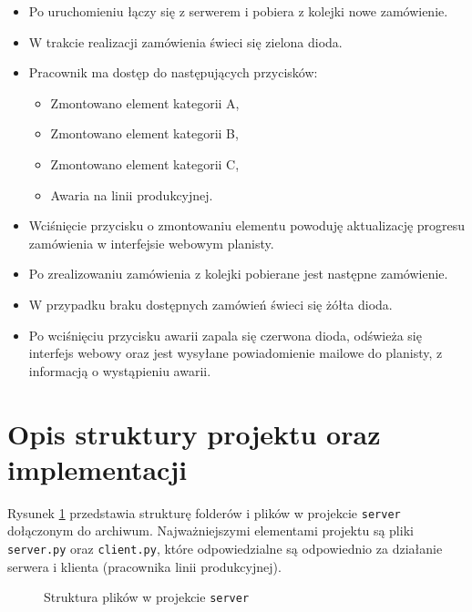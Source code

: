 \documentclass{article}
\begin{document}
\begin{itemize}
    \item Po uruchomieniu łączy się z serwerem i pobiera z kolejki nowe zamówienie.
    \item W trakcie realizacji zamówienia świeci się zielona dioda.
    \item Pracownik ma dostęp do następujących przycisków:
    \begin{itemize}
        \item Zmontowano element kategorii A,
        \item Zmontowano element kategorii B,
        \item Zmontowano element kategorii C,
        \item Awaria na linii produkcyjnej.
    \end{itemize}
    \item Wciśnięcie przycisku o zmontowaniu elementu powoduję aktualizację progresu zamówienia w interfejsie webowym planisty.
    \item Po zrealizowaniu zamówienia z kolejki pobierane jest następne zamówienie.
    \item W przypadku braku dostępnych zamówień świeci się żółta dioda.
    \item Po wciśnięciu przycisku awarii zapala się czerwona dioda, odświeża się interfejs webowy oraz jest wysyłane powiadomienie mailowe do planisty, z informacją o wystąpieniu awarii.
\end{itemize}

\section{Opis struktury projektu oraz implementacji}
\label{implementacja-www}

Rysunek \ref{fig:tree} przedstawia strukturę folderów i plików w projekcie \texttt{server} dołączonym do archiwum. Najważniejszymi elementami projektu są pliki \texttt{server.py} oraz \texttt{client.py}, które odpowiedzialne są odpowiednio za działanie serwera i klienta (pracownika linii produkcyjnej).

\begin{figure}[H]
    \caption{Struktura plików w projekcie \texttt{server}}
    \label{fig:tree}
\end{figure}
\end{document}
